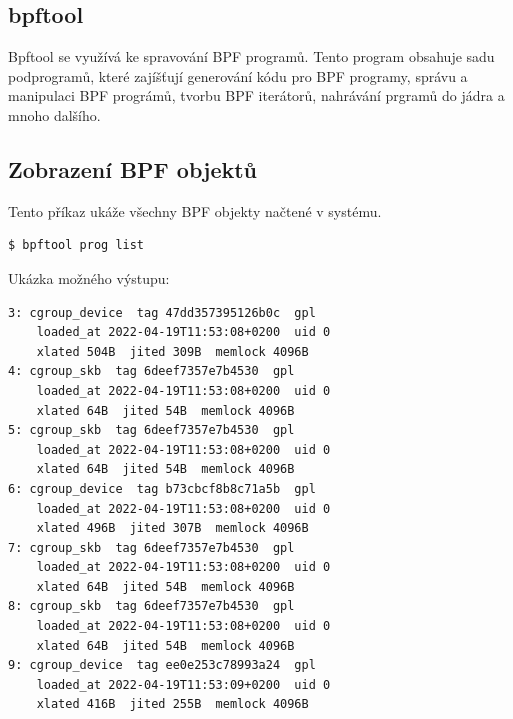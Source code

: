 \subsection{bpftool}
\label{sec:bpftool}

Bpftool\cite{bpftool} se využívá ke spravování BPF programů. Tento program obsahuje sadu podprogramů, které zajíšťují generování kódu pro BPF programy, správu a manipulaci BPF prográmů, tvorbu BPF iterátorů, nahrávání prgramů do jádra a mnoho dalšího.

\subsection*{Zobrazení BPF objektů}
Tento příkaz ukáže všechny BPF objekty načtené v systému.
\begin{lstlisting}[language=bash]
    $ bpftool prog list
\end{lstlisting}

\noindent Ukázka možného výstupu:
\begin{lstlisting}[language=bash]
3: cgroup_device  tag 47dd357395126b0c  gpl
	loaded_at 2022-04-19T11:53:08+0200  uid 0
	xlated 504B  jited 309B  memlock 4096B
4: cgroup_skb  tag 6deef7357e7b4530  gpl
	loaded_at 2022-04-19T11:53:08+0200  uid 0
	xlated 64B  jited 54B  memlock 4096B
5: cgroup_skb  tag 6deef7357e7b4530  gpl
	loaded_at 2022-04-19T11:53:08+0200  uid 0
	xlated 64B  jited 54B  memlock 4096B
6: cgroup_device  tag b73cbcf8b8c71a5b  gpl
	loaded_at 2022-04-19T11:53:08+0200  uid 0
	xlated 496B  jited 307B  memlock 4096B
7: cgroup_skb  tag 6deef7357e7b4530  gpl
	loaded_at 2022-04-19T11:53:08+0200  uid 0
	xlated 64B  jited 54B  memlock 4096B
8: cgroup_skb  tag 6deef7357e7b4530  gpl
	loaded_at 2022-04-19T11:53:08+0200  uid 0
	xlated 64B  jited 54B  memlock 4096B
9: cgroup_device  tag ee0e253c78993a24  gpl
	loaded_at 2022-04-19T11:53:09+0200  uid 0
	xlated 416B  jited 255B  memlock 4096B
\end{lstlisting}

